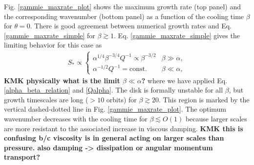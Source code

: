 Fig. \ref{gammie_maxrate_plot} shows the maximum
growth rate (top panel) and the corresponding wavenumber (bottom
panel) as a function of the cooling time $\beta$ for $\theta=0$.  
There is good agreement between numerical growth rates and
Eq. \ref{gammie_maxrate_simple} for $\beta \gtrsim 1$. 
Eq. \ref{gammie_maxrate_simple} gives the
limiting behavior for this case as   
\begin{align*}
  S_*\propto \begin{cases}
    \alpha^{1/4}\beta^{-3/4}Q^{-1}\propto \beta^{-3/2} 
    &  \beta \gg \alpha, \\
    \alpha^{-1/2}Q^{-1} = \mathrm{const.} & \beta \ll \alpha,    
  \end{cases}
\end{align*}
{\bf KMK physically what is the limit $\beta \ll \alpha$?}
where we have applied Eq. \ref{alpha_beta_relation}
and \ref{Qalpha}. The disk is formally unstable for all $\beta$, but
growth timescales are long ($>10$ orbits) for $\beta \gtrsim
20$. %
This region is marked by the vertical dashed-dotted line in
Fig. \ref{gammie_maxrate_plot}. The optimum wavenumber decreases with
the cooling time for $\beta\lesssim O(1)$ because larger scales are
more resistant to the associated increase in viscous damping.   {\bf KMK this is
confusing b/c viscosity is in general acting on larger scales than pressure. also damping -> dissipation or 
angular momentum transport?}

